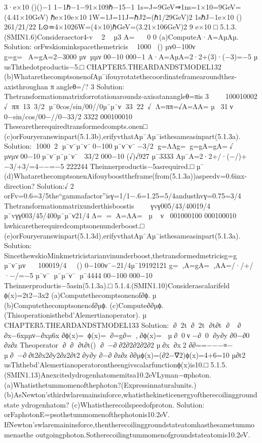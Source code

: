 {{{{{{{{{{3·e×10
()()−1
1−1ℏ−1−91×109ℏ−15−1
1s=J=9GeV⇒1ns=1×10=9GeV=(4.41×10GeV)
ℏe×10e×10
1W=1J=11J=ℏJ2=(ℏ1/29GeV)2
1sℏJ−1e×10
()
261/21/22
L⊙≃4×1026W=(4×10)ℏGeV=(3.21×106GeV)2
9
e×10
□
5.1.3.(SMIN1.6)Consideraector4-v

2

µ3
A=

0
0
(a)ComputeA·A=AµAµ.
Solution:
orFwskiominkspacethemetricis

1000
()
µν0−100ν
g=g=⇒A=gA=2−3000
µνµµν
00−10
000−1
A·A=AµA=2·2+(3)·(−3)=−5
µ
usThthedotproductis−5.□
CHAPTER5.THEARDANDSTMODEL132
(b)WhatarethecomptsonenofAµ¯ifouyrotatethecoordinateframearoundthez-axisthroughan
π
angleθ=/?
3
Solution:
Thetransformationmatrixforrotationaroundz-axisatanangleθ=πis
3

100010002
√
ππ133/2
µ¯0cos/sin/00//0µ¯µ¯ν
3322√
Λ=ππ=√A=ΛA=
µ31ν
0−sin/cos/00−//0−33/2
3322
000100010
Thesearetherequiredtransformedcompts.onen□
(c)orFouryeranswinpart(5.1.3b),erifyvthatAµ¯Aµ¯isthesameasinpart(5.1.3a).
Solution:
10002
µ¯ν¯µ¯ν¯0−100µ¯ν¯ν¯−3/2
g=ΛΛg=g=gA=gA=√
µνµν00−10µ¯ν¯µ¯µ¯ν¯
33/2
000−10
(√)√927
µ¯3333
Aµ¯A=2·2+/·(−/)+−3/+3/=4−−=−5
222244
Theinnerproductis−5asrequired.□
µ¯
(d)WhatarethecomptsonenAifouyboosttheframe(from(5.1.3a))aspeedv=0.6inx-direction?
Solution:√
2
orFv=0.6=3/5the“gammafactor”isγ=1/1−.6=1.25=5/4andusthvγ=0.75=3/4
Thetransformationmatrixunderthisboostis

γvγ005/43/40019/4

µ¯vγγ003/45/400µ¯µ¯ν21/4
Λ==A=ΛA=
µν
001000100
000100010
hwhicaretherequiredcomptsonenunderboost.□
(e)orFouryeranswinpart(5.1.3d),erifyvthatAµ¯Aµ¯isthesameasinpart(5.1.3a).
Solution:
SincethewskioMinkmetricistarianvinunderboost,thetransformedmetricisg=g
µ¯ν¯µν

100019/4
()
0−100ν¯−21/4µ¯19192121
g=,A=gA=,AA=/·/+/·−/=−5
µ¯ν¯µ¯µ¯ν¯µ¯4444
00−100
000−10
Theinnerproductis−5asin(5.1.3a).□
5.1.4.(SMIN1.10)Considerascalarifeld
ϕ(x)=2t2−3x2
(a)Computethecomptsonenof∂ϕ.
µ
(b)Computethecomptsonenof∂µϕ.
(c)Compute∂∂µϕ.(Thisoperationisthebd’Alemertianoperator).
µ
CHAPTER5.THEARDANDSTMODEL133
Solution:
∂2t∂2t
∂t∂t
∂∂
∂x−6xµµν−∂xµ6x
∂ϕ(x)=ϕ(x)=∂=g∂=,⇒∂ϕ(x)=
µ∂0ν−∂0
∂y∂y
∂0−∂0
∂z∂z
Theoperator
∂∂
∂t∂t()
∂−∂∂2∂2∂2∂2∂2
µ∂x∂x2
∂∂==−−−≡−∇
µ∂−∂∂t2∂x2∂y2∂z2∂t2
∂y∂y
∂−∂
∂z∂z
∂∂µϕ(x)=(∂2−∇2)ϕ(x)=4+6=10
µ∂t2
usThthebd’Alemertianoperatorontheengivscalarfunctionϕ(x)is10.□
5.1.5.(SMIN1.13)Anexcitedydrogenhatomemitsa10.2eVLyman−αphoton.
(a)Whatisthetummomenofthephoton?(Expressinnaturalunits.)
(b)AsNewton’sthirdwlaremainsinforce,whatisthekineticenergyoftherecoilinggroundstate
ydrogenhatom?
(c)Whatistherecoilspeedofproton.
Solution:
orFaphotonE=psothetummomenofthephotonis10.2eV.
IfNewton’swlaremaininsforce,thentherecoilinggroundstateatomhasthesametummomenasthe
outgoingphoton.Sotherecoilingtummomenofgroundstateatomis10.2eV.
}}}}}}}}}}

